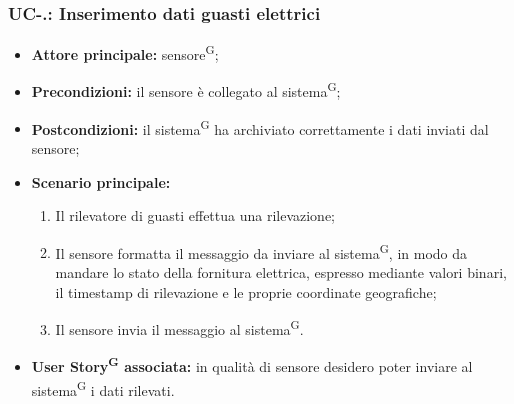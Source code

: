 \documentclass[8pt]{article}
\newcommand{\glossterm}[1]{#1\textsuperscript{G}} %
\begin{document}
\subsubsection*{UC-\theuc .\speconenumber: Inserimento dati guasti elettrici}
\begin{itemize}
    \item \textbf{Attore principale:} \glossterm{sensore};
    \item \textbf{Precondizioni:} il sensore è collegato al \glossterm{sistema};
    \item \textbf{Postcondizioni:} il \glossterm{sistema} ha archiviato correttamente i dati inviati dal sensore;
    \item \textbf{Scenario principale:}
        \begin{enumerate}
        \item Il rilevatore di guasti effettua una rilevazione;
        \item Il sensore formatta il messaggio da inviare al \glossterm{sistema}, in modo da mandare lo stato della fornitura elettrica, espresso mediante valori binari, il timestamp di rilevazione e le proprie coordinate geografiche;
        \item Il sensore invia il messaggio al \glossterm{sistema}.
        \end{enumerate}
    \item \textbf{\glossterm{User Story} associata:} in qualità di sensore desidero poter inviare al \glossterm{sistema} i dati rilevati.
\end{itemize}
\end{document}
